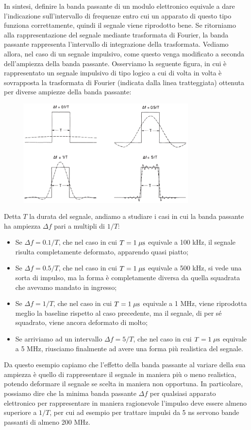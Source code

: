 In sintesi, definire la banda passante di un modulo elettronico equivale a dare l'indicazione sull'intervallo di frequenze entro cui un apparato di questo tipo funziona correttamente, quindi il segnale viene riprodotto bene. Se ritorniamo alla rappresentazione del segnale mediante trasformata di Fourier, la banda passante rappresenta l'intervallo di integrazione della trasformata. Vediamo allora, nel caso di un segnale impulsivo, come questo venga modificato a seconda dell'ampiezza della banda passante. Osserviamo la seguente figura, in cui è rappresentato un segnale impulsivo di tipo logico a cui di volta in volta è sovrapposta la trasformata di Fourier (indicata dalla linea tratteggiata) ottenuta per diverse ampiezze della banda passante:
\begin{figure}[H]
   \centering
   \includegraphics[width=0.8\textwidth]{immagini/banda_passante_segnale_impulsivo.png}
\end{figure}
Detta $T$ la durata del segnale, andiamo a studiare i casi in cui la banda passante ha ampiezza $\Delta f$ pari a multipli di $1/T$:
\begin{itemize}[leftmargin=0.5cm]
   \item Se $\Delta f=0.1/T$, che nel caso in cui $T=1 \; \rm \mu s$ equivale a 100 kHz, il segnale risulta completamente deformato, apparendo quasi piatto;
   \item Se $\Delta f=0.5/T$, che nel caso in cui $T=1 \; \rm \mu s$ equivale a 500 kHz, si vede una sorta di impulso, ma la forma è completamente diversa da quella squadrata che avevamo mandato in ingresso;
   \item Se $\Delta f=1/T$, che nel caso in cui $T=1 \; \rm \mu s$ equivale a 1 MHz, viene riprodotta meglio la baseline rispetto al caso precedente, ma il segnale, di per sé squadrato, viene ancora deformato di molto;
   \item Se arriviamo ad un intervallo $\Delta f=5/T$, che nel caso in cui $T=1 \; \rm \mu s$ equivale a 5 MHz, riusciamo finalmente ad avere una forma più realistica del segnale.
\end{itemize}
Da questo esempio capiamo che l'effetto della banda passante al variare della sua ampiezza è quello di rappresentare il segnale in maniera più o meno realistica, potendo deformare il segnale se scelta in maniera non opportuna. In particolare, possiamo dire che la minima banda passante $\Delta f$ per qualsiasi apparato elettronico per rappresentare in maniera ragionevole l'impulso deve essere almeno superiore a $1/T$, per cui ad esempio per trattare impulsi da 5 ns servono bande passanti di almeno 200 MHz.


